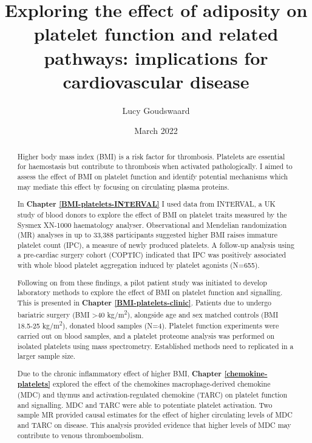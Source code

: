 \documentclass[11pt,twoside]{bristolthesis}
\title{Exploring the effect of adiposity on platelet function and related pathways: implications for cardiovascular disease}
\author{Lucy Goudswaard}
\date{March 2022}
\begin{document}
  \maketitle

\frontmatter %
\pagestyle{empty} %
\begingroup
  \begin{abstract}
    Higher body mass index (BMI) is a risk factor for thrombosis. Platelets are essential for haemostasis but contribute to thrombosis when activated pathologically. I aimed to assess the effect of BMI on platelet function and identify potential mechanisms which may mediate this effect by focusing on circulating plasma proteins.

    In \textbf{Chapter \ref{BMI-platelets-INTERVAL}} I used data from INTERVAL, a UK study of blood donors to explore the effect of BMI on platelet traits measured by the Sysmex XN-1000 haematology analyser. Observational and Mendelian randomization (MR) analyses in up to 33,388 participants suggested higher BMI raises immature platelet count (IPC), a measure of newly produced platelets. A follow-up analysis using a pre-cardiac surgery cohort (COPTIC) indicated that IPC was positively associated with whole blood platelet aggregation induced by platelet agonists (N=655).

    Following on from these findings, a pilot patient study was initiated to develop laboratory methods to explore the effect of BMI on platelet function and signalling. This is presented in \textbf{Chapter \ref{BMI-platelets-clinic}}. Patients due to undergo bariatric surgery (BMI \textgreater40 kg/m\textsuperscript{2}), alongside age and sex matched controls (BMI 18.5-25 kg/m\textsuperscript{2}), donated blood samples (N=4). Platelet function experiments were carried out on blood samples, and a platelet proteome analysis was performed on isolated platelets using mass spectrometry. Established methods need to replicated in a larger sample size.

    Due to the chronic inflammatory effect of higher BMI, \textbf{Chapter \ref{chemokine-platelets}} explored the effect of the chemokines macrophage-derived chemokine (MDC) and thymus and activation-regulated chemokine (TARC) on platelet function and signalling. MDC and TARC were able to potentiate platelet activation. Two sample MR provided causal estimates for the effect of higher circulating levels of MDC and TARC on disease. This analysis provided evidence that higher levels of MDC may contribute to venous thromboembolism.


\end{abstract}
\end{document}
